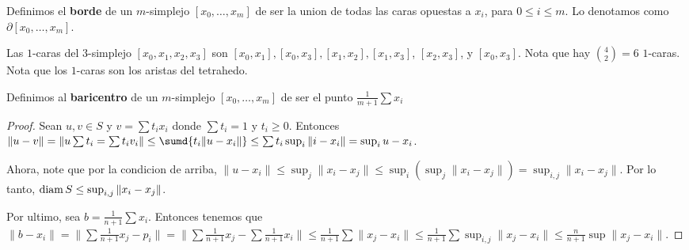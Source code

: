 \begin{definition}
    Definimos el \textbf{borde} de un $m$-simplejo  $[x_0, \dots, x_m]$ de ser
    la union de todas las caras opuestas a $x_i$, para  $0 \leq i \leq m$. Lo
    denotamos como  $\partial{[x_0, \dots, x_m]}$.
\end{definition}

\begin{example}\label{}
    Las $1$-caras del  $3$-simplejo  $[x_0,x_1,x_2,x_3]$ son $[x_0,x_1],
    [x_0,x_3],[x_1,x_2], [x_1,x_3]$, $[x_2,x_3]$, y $[x_0,x_3]$. Nota que hay
    ${4 \choose 2}=6$ $1$-caras. Nota que los $1$-caras son los aristas del
    tetrahedo.
\end{example}

\begin{definition}
    Definimos al \textbf{baricentro} de un $m$-simplejo $[x_0, \dots, x_m]$ de
    ser el punto $\frac{1}{m+1}\sum{x_i}$
\end{definition}

\begin{proof}
    Sean $u,v \in S$ y  $v=\sum{t_ix_i}$ donde $\sum{t_i}=1$ y $t_i \geq 0$.
    Entonces $\|u-v\|=\|u\sum{t_i}=\sum{t_iv_i}\| \leq \sumd{t_i\|u-x_i\|} \leq
    \sum{t_i}\sup_i{\|i-x_i\|}=\sup_i{u-x_i}$.

    Ahora, note que por la condicion de arriba, $\|u-x_i\| \leq
    \sup_j{\|x_i-x_j\|} \leq
    \sup_i{(\sup_j{\|x_i-x_j\|})}=\sup_{i,j}{\|x_i-x_j\|}$. Por lo tanto,
    $\operatorname{diam}{S} \leq \sup_{i,j}{\|x_i-x_j\|}$.

    Por ultimo, sea $b=\frac{1}{n+1}{\sum{x_i}}$. Entonces tenemos que
    $\|b-x_i\|=\|\sum{\frac{1}{n+1}{x_j}}-p_i\|=\|\sum{\frac{1}{n+1}x_j}-
    \sum{\frac{1}{n+1}}x_i\| \leq \frac{1}{n+1}\sum{\|x_j-x_i\|} \leq
    \frac{1}{n+1}\sum{\sup_{i,j}{\|x_j-x_i\|}} \leq
    \frac{n}{n+1}\sup{\|x_j-x_i\|}$.
\end{proof}

